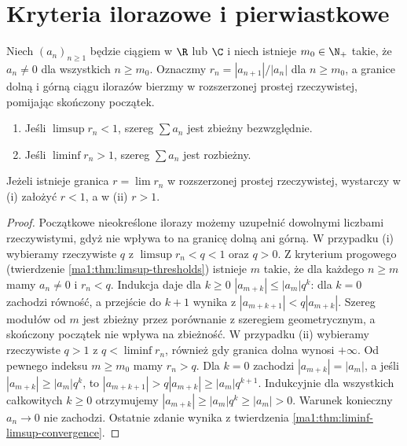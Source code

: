 \section{Kryteria ilorazowe i pierwiastkowe}
\begin{twierdzenie}
\label{ma1:thm:ratio-test}
Niech $(a_n)_{n\ge1}$ będzie ciągiem w $\R$ lub $\C$ i niech istnieje $m_0\in\N_+$ takie, że $a_n\ne0$ dla wszystkich $n\ge m_0$. Oznaczmy $r_n=|a_{n+1}|/|a_n|$ dla $n\ge m_0$, a granice dolną i górną ciągu ilorazów bierzmy w rozszerzonej prostej rzeczywistej, pomijając skończony początek.
\begin{enumerate}[label=(\roman*)]
\item Jeśli $\limsup r_n<1$, szereg $\sum a_n$ jest zbieżny bezwzględnie.
\item Jeśli $\liminf r_n>1$, szereg $\sum a_n$ jest rozbieżny.
\end{enumerate}
Jeżeli istnieje granica $r=\lim r_n$ w rozszerzonej prostej rzeczywistej, wystarczy w (i) założyć $r<1$, a w (ii) $r>1$.
\end{twierdzenie}
\begin{proof}
Początkowe nieokreślone ilorazy możemy uzupełnić dowolnymi liczbami rzeczywistymi, gdyż nie wpływa to na granicę dolną ani górną. W przypadku (i) wybieramy rzeczywiste $q$ z $\limsup r_n<q<1$ oraz $q>0$. Z kryterium progowego (twierdzenie \ref{ma1:thm:limsup-thresholds}) istnieje $m$ takie, że dla każdego $n\ge m$ mamy $a_n\ne0$ i $r_n<q$. Indukcja daje dla $k\ge0$
$|a_{m+k}|\le |a_m|q^k$: dla $k=0$ zachodzi równość, a przejście do $k+1$ wynika z $|a_{m+k+1}|<q|a_{m+k}|$. Szereg modułów od $m$ jest zbieżny przez porównanie z szeregiem geometrycznym, a skończony początek nie wpływa na zbieżność.
W przypadku (ii) wybieramy rzeczywiste $q>1$ z $q<\liminf r_n$, również gdy granica dolna wynosi $+\infty$. Od pewnego indeksu $m\ge m_0$ mamy $r_n>q$. Dla $k=0$ zachodzi $|a_{m+k}|=|a_m|$, a jeśli $|a_{m+k}|\ge |a_m|q^k$, to $|a_{m+k+1}|>q|a_{m+k}|\ge|a_m|q^{k+1}$. Indukcyjnie dla wszystkich całkowitych $k\ge0$ otrzymujemy $|a_{m+k}|\ge|a_m|q^k\ge|a_m|>0$. Warunek konieczny $a_n\to0$ nie zachodzi. Ostatnie zdanie wynika z twierdzenia \ref{ma1:thm:liminf-limsup-convergence}.
\end{proof}


